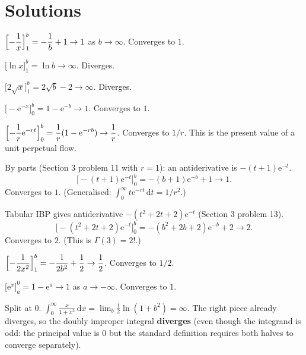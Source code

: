 \section{Solutions}

\begin{solutions}
  \item $\displaystyle\Bigl[-\frac{1}{x}\Bigr]_{1}^{b}=-\frac{1}{b}+1\to 1$
        as $b\to\infty$. Converges to $1$.

  \item $\displaystyle\bigl[\ln x\bigr]_{1}^{b}=\ln b\to\infty$. Diverges.

  \item $\displaystyle\bigl[2\sqrt{x}\bigr]_{1}^{b}=2\sqrt{b}-2\to\infty$.
        Diverges.

  \item $\displaystyle\bigl[-\mathrm{e}^{-x}\bigr]_{0}^{b}=1-\mathrm{e}^{-b}\to 1$.
        Converges to $1$.

  \item $\displaystyle\Bigl[-\frac{1}{r}\mathrm{e}^{-rt}\Bigr]_{0}^{b}
        =\frac{1}{r}(1-\mathrm{e}^{-rb})\to\frac{1}{r}$. Converges to
        $1/r$. This is the present value of a unit perpetual flow.

  \item By parts (Section 3 problem 11 with $r=1$): an antiderivative is
        $-(t+1)\mathrm{e}^{-t}$.
        \[
          \bigl[-(t+1)\mathrm{e}^{-t}\bigr]_{0}^{b}=-(b+1)\mathrm{e}^{-b}+1\to 1 .
        \]
        Converges to $1$. (Generalised:
        $\int_{0}^{\infty} t\mathrm{e}^{-rt}\,\mathrm{d}t=1/r^{2}$.)

  \item Tabular IBP gives antiderivative
        $-(t^{2}+2t+2)\mathrm{e}^{-t}$ (Section 3 problem 13).
        \[
          \bigl[-(t^{2}+2t+2)\mathrm{e}^{-t}\bigr]_{0}^{b}
            =-(b^{2}+2b+2)\mathrm{e}^{-b}+2\to 2 .
        \]
        Converges to $2$. (This is $\Gamma(3)=2!$.)

  \item $\displaystyle\Bigl[-\frac{1}{2x^{2}}\Bigr]_{1}^{b}
        =-\frac{1}{2b^{2}}+\frac{1}{2}\to\frac{1}{2}$. Converges to $1/2$.

  \item $\displaystyle\bigl[\mathrm{e}^{x}\bigr]_{a}^{0}=1-\mathrm{e}^{a}\to 1$
        as $a\to-\infty$. Converges to $1$.

  \item Split at $0$.
        $\int_{0}^{\infty} \frac{x}{1+x^{2}}\,\mathrm{d}x
        =\lim_{b}\frac{1}{2}\ln(1+b^{2})=\infty$. The right piece
        already diverges, so the doubly improper integral
        \textbf{diverges} (even though the integrand is odd: the
        principal value is $0$ but the standard definition requires
        both halves to converge separately).


\end{solutions}
